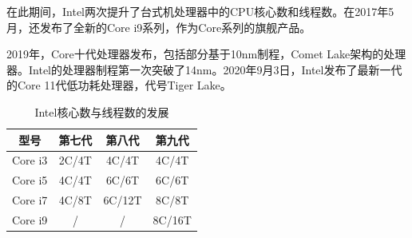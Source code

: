 \documentclass[UTF8]{ctexart}
\begin{document}
在此期间，Intel两次提升了台式机处理器中的CPU核心数和线程数。在2017年5月，还发布了全新的Core i9系列，作为Core系列的旗舰产品。
\begin{figure}[H]
    \centering
\end{figure}


2019年，Core十代处理器发布，包括部分基于10nm制程，Comet Lake架构的处理器。Intel的处理器制程第一次突破了14nm。2020年9月3日，Intel发布了最新一代的Core 11代低功耗处理器，代号Tiger Lake。
\begin{table}[H]
    \centering
    \caption{Intel核心数与线程数的发展}
    \begin{tabular}{cccc}
        \toprule
        型号    & 第七代 & 第八代 & 第九代 \\
        \midrule
        Core i3 & 2C/4T  & 4C/4T  & 4C/4T  \\
        Core i5 & 4C/4T  & 6C/6T  & 6C/6T  \\
        Core i7 & 4C/8T  & 6C/12T & 8C/8T  \\
        Core i9 & /      & /      & 8C/16T \\
        \bottomrule
    \end{tabular}
\end{table}
\newpage
\end{document}

